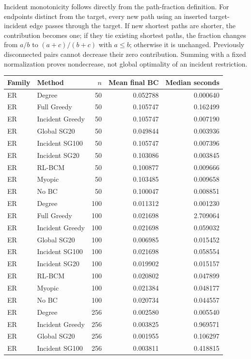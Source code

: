 Incident monotonicity follows directly from the path-fraction definition. For endpoints distinct from the target, every new path using an inserted target-incident edge passes through the target. If new shortest paths are shorter, the contribution becomes one; if they tie existing shortest paths, the fraction changes from $a/b$ to $(a+c)/(b+c)$ with $a\le b$; otherwise it is unchanged. Previously disconnected pairs cannot decrease their zero contribution. Summing with a fixed normalization proves nondecrease, not global optimality of an incident restriction.

\begin{longtable}{llrrr}\toprule Family & Method & $n$ & Mean final BC & Median seconds\\\midrule\endhead
ER & Degree & 50 & 0.052788 & 0.000640\\
ER & Full Greedy & 50 & 0.105747 & 0.162499\\
ER & Incident Greedy & 50 & 0.105747 & 0.007190\\
ER & Global SG20 & 50 & 0.049844 & 0.003936\\
ER & Incident SG100 & 50 & 0.105747 & 0.007396\\
ER & Incident SG20 & 50 & 0.103086 & 0.003845\\
ER & RL-BCM & 50 & 0.100877 & 0.009666\\
ER & Myopic & 50 & 0.103485 & 0.009658\\
ER & No BC & 50 & 0.100047 & 0.008851\\
ER & Degree & 100 & 0.011312 & 0.001230\\
ER & Full Greedy & 100 & 0.021698 & 2.709064\\
ER & Incident Greedy & 100 & 0.021698 & 0.059032\\
ER & Global SG20 & 100 & 0.006985 & 0.015452\\
ER & Incident SG100 & 100 & 0.021698 & 0.058554\\
ER & Incident SG20 & 100 & 0.019902 & 0.015157\\
ER & RL-BCM & 100 & 0.020802 & 0.047899\\
ER & Myopic & 100 & 0.021384 & 0.048177\\
ER & No BC & 100 & 0.020734 & 0.044557\\
ER & Degree & 256 & 0.002580 & 0.005540\\
ER & Incident Greedy & 256 & 0.003825 & 0.969571\\
ER & Global SG20 & 256 & 0.001955 & 0.106297\\
ER & Incident SG100 & 256 & 0.003811 & 0.418815\\

\end{longtable}
